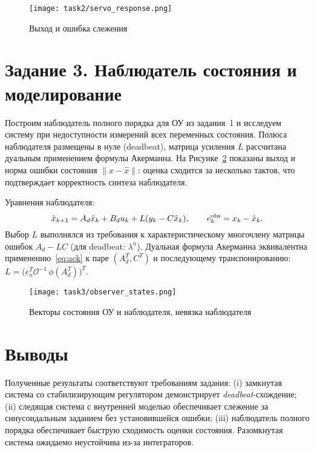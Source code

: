 \begin{figure}[H]
    \centering
    \texttt{[image: task2/servo\_response.png]}
    \caption{Выход и ошибка слежения}
    \label{fig:task2_resp}
\end{figure}

\section{Задание 3. Наблюдатель состояния и моделирование}
Построим наблюдатель полного порядка для ОУ из задания~1 и исследуем систему при недоступности измерений всех переменных состояния. Полюса наблюдателя размещены в нуле (deadbeat), матрица усиления $L$ рассчитана дуальным применением формулы Акерманна. На Рисунке~\ref{fig:task3_obs} показаны выход и норма ошибки состояния $\lVert x-\hat x\rVert$: оценка сходится за несколько тактов, что подтверждает корректность синтеза наблюдателя.

Уравнения наблюдателя:
\[
 \hat x_{k+1}=A_d \hat x_k + B_d u_k + L( y_k - C\hat x_k ),\qquad 
 e_k^{\rm obs}=x_k-\hat x_k.
\]
Выбор $L$ выполнялся из требования к характеристическому многочлену матрицы ошибок $A_d-LC$ (для deadbeat: $\lambda^n$). Дуальная формула Акерманна эквивалентна применению~\eqref{eq:ack} к паре $(A_d^T,C^T)$ и последующему транспонированию: $L=\bigl(e_n^T \mathcal O^{-1}\, \phi(A_d^T)\bigr)^T$.

\begin{figure}[H]
    \centering
    \texttt{[image: task3/observer\_states.png]}
    \caption{Векторы состояния ОУ и наблюдателя, невязка наблюдателя}
    \label{fig:task3_obs}
\end{figure}

\section{Выводы}
Полученные результаты соответствуют требованиям задания: (i) замкнутая система со стабилизирующим регулятором демонстрирует \textit{deadbeat}-схождение; (ii) следящая система с внутренней моделью обеспечивает слежение за синусоидальным заданием без установившейся ошибки; (iii) наблюдатель полного порядка обеспечивает быструю сходимость оценки состояния. Разомкнутая система ожидаемо неустойчива из-за интеграторов.

\clearpage





